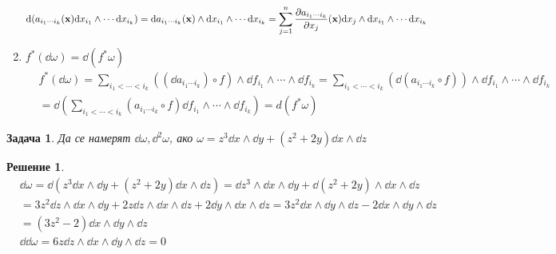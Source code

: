 \documentclass[12pt]{article}
\newtheorem{problem}{Задача}
\newtheorem*{solution*}{Решение}
\newcommand\myxi[0]{\boldsymbol{\xi}}
\begin{document}
\begin{large}
\begin{enumerate}
\begin{align*}
\dd (a_{i_1 \cdots i_k}(\mathbf{x}) \dd x_{i_1} \wedge \cdots \dd x_{i_k})=\dd a_{i_1 \cdots i_k}(\mathbf{x}) \wedge \dd x_{i_1} \wedge \cdots \dd x_{i_k}=\sum_{j=1}^{n} \pdv{a_{i_1 \cdots i_k}}{x_j}(\mathbf{x}) \dd x_j \wedge \dd x_{i_1} \wedge \cdots \dd x_{i_k}
\end{align*} 
\item $f^*(\dd \omega)=\dd(f^* \omega)$
\begin{align*}
&f^*(\dd \omega) = \sum_{i_1<\cdots<i_k} ((\dd a_{i_1 \cdots i_k}) \circ f) \wedge \dd f_{i_1} \wedge \cdots  \wedge \dd f_{i_k} = \sum_{i_1<\cdots<i_k} (\dd( a_{i_1 \cdots i_k} \circ f)) \wedge \dd f_{i_1} \wedge \cdots  \wedge \dd f_{i_k} \\
&= \dd (\sum_{i_1<\cdots<i_k} ( a_{i_1 \cdots i_k} \circ f) \dd f_{i_1} \wedge \cdots  \wedge \dd f_{i_k}) = d(f^* \omega)
\end{align*}
\end{enumerate}

\begin{problem}
Да се намерят $\dd \omega, \dd^2 \omega$, ако $\omega = z^3 \dd x \wedge \dd y + (z^2+2y) \dd x \wedge \dd z$
\end{problem}

\begin{solution*}
\begin{align*}
&\dd \omega = \dd (z^3 \dd x \wedge \dd y + (z^2+2y) \dd x \wedge \dd z) = \dd z^3 \wedge \dd x \wedge \dd y + \dd(z^2+2y) \wedge \dd x \wedge \dd z \\
&=3z^2 \dd z \wedge \dd x \wedge \dd y + 2z \dd z \wedge \dd x \wedge \dd z + 2 \dd y \wedge \dd x \wedge \dd z =3z^2 \dd x \wedge \dd y \wedge \dd z - 2 \dd x \wedge \dd y \wedge \dd z \\
&=(3z^2-2)\dd x \wedge \dd y \wedge \dd z \\
&\dd \dd \omega = 6 z \dd z \wedge \dd x \wedge \dd y \wedge \dd z = 0
\end{align*}
\end{solution*}


\end{large}
\end{document}
